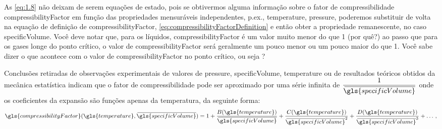     As \cref{eq:1.8} não deixam de serem equações de estado, pois se obtivermos
    alguma informação sobre o fator de compressibilidade
    \gls{compressibilityFactor} em função das propriedades mensuráveis
    independentes, p.ex., \gls{temperature}, \gls{pressure}, poderemos
    substituir de volta na equação de definição de \gls{compressibilityFactor},
    \cref{eq:compressibilityFactorDefinition} e então obter a propriedade
    remanescente, no caso \gls{specificVolume}. Você deve notar que, para os líquidos,
    \gls{compressibilityFactor} é um valor muito menor do que 1 (por quê?) ao
    passo que para os gases longe do ponto crítico, o valor de
    \gls{compressibilityFactor} será geralmente um pouco menor ou um pouco
    maior do que 1. Você sabe dizer o que acontece com o valor de
    \gls{compressibilityFactor} no ponto crítico, ou seja
    ?

    Conclusões retiradas de observações experimentais de valores de
    \gls{pressure}, \gls{specificVolume}, \gls{temperature} ou de resultados
    teóricos obtidos da mecânica estatística indicam que o fator de
    compressibilidade pode ser aproximado por uma série infinita de
    $\dfrac{1}{\molar{\gls{specificVolume}}}$ onde os coeficientes da expansão
    são funções apenas da temperatura, da seguinte forma:
	\begin{equation}  \label{eq:1.9}
        \gls{compressibilityFactor}
        \functionOf{
            \gls{temperature},
            \molar{\gls{specificVolume}}
        }
        =
        1
        +
        \frac{
            B\functionOf{\gls{temperature}}
        }{
            \molar{\gls{specificVolume}}
        }
        +
        \frac{
            C\functionOf{\gls{temperature}}
        }{
            \molar{\gls{specificVolume}}^2
        }
        +
        \frac{
            D\functionOf{\gls{temperature}}
        }{
            \molar{\gls{specificVolume}}^3
        }
        +
        \dots\,,
    \end{equation}

